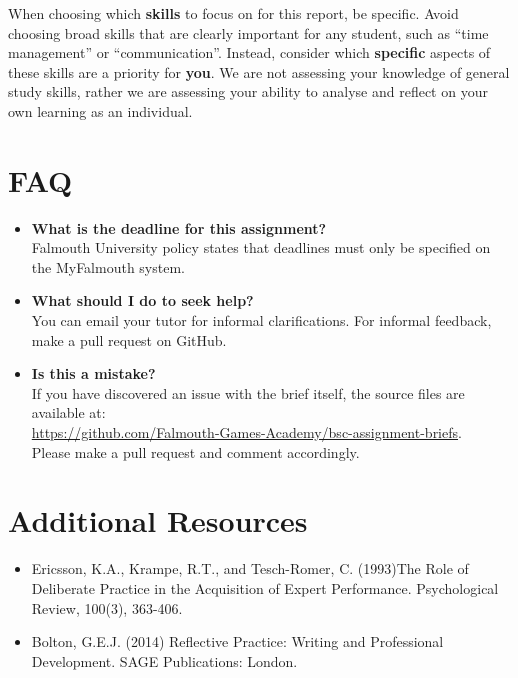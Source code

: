 \documentclass{../../fal_assignment}
\begin{document}
When choosing which \textbf{skills} to focus on for this report, be specific. Avoid choosing broad skills that are clearly important for any student, such as ``time management'' or ``communication''. Instead, consider which \textbf{specific} aspects of these skills are a priority for \textbf{you}. We are not assessing your knowledge of general study skills, rather we are assessing your ability to analyse and reflect on your own learning as an individual.

\section*{FAQ}

\begin{itemize}
	\item 	\textbf{What is the deadline for this assignment?} \\ 
    		Falmouth University policy states that deadlines must only be specified on the MyFalmouth system.
    			    		    		
	\item 	\textbf{What should I do to seek help?} \\ 
    		You can email your tutor for informal clarifications. For informal feedback, make a pull request on GitHub. 
    		
    	\item 	\textbf{Is this a mistake?} \\ 	
    		If you have discovered an issue with the brief itself, the source files are available at: \\
    		\url{https://github.com/Falmouth-Games-Academy/bsc-assignment-briefs}.\\
    		 Please make a pull request and comment accordingly.
\end{itemize}

\section*{Additional Resources}

\begin{itemize}
    \item Ericsson, K.A., Krampe, R.T., and Tesch-Romer, C. (1993)The Role of Deliberate Practice in the Acquisition of Expert Performance. Psychological Review, 100(3), 363-406.
    \item Bolton, G.E.J. (2014) Reflective Practice: Writing and Professional Development. SAGE Publications: London.
\end{itemize}
\end{document}
